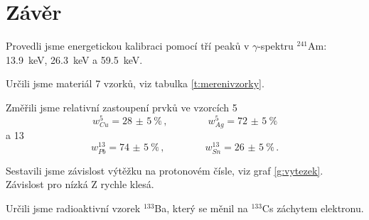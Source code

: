 \section*{Závěr}
Provedli jsme energetickou kalibraci pomocí tří peaků v $\gamma$-spektru $^{241}$Am: \SI{13.9}{\keV}, \SI{26.3}{\keV} a \SI{59.5}{\keV}.

Určili jsme materiál 7 vzorků, viz tabulka \ref{t:merenivzorky}.

Změřili jsme relativní zastoupení prvků ve vzorcích 5
\begin{equation*}
w_{Cu}^5=\SI{28(5)}{\percent} \,,\qquad \qquad w_{Ag}^5=\SI{72(5)}{\percent}
\end{equation*}
a 13
\begin{equation*}
w_{Pb}^{13}=\SI{74(5)}{\percent} \,,\qquad \qquad w_{Sn}^{13}=\SI{26(5)}{\percent} \,.
\end{equation*}

Sestavili jsme závislost výtěžku na protonovém čísle, viz graf \ref{g:vytezek}. Závislost pro nízká Z rychle klesá.

Určili jsme radioaktivní vzorek $^{133}$Ba, který se měnil na $^{133}$Cs záchytem elektronu.